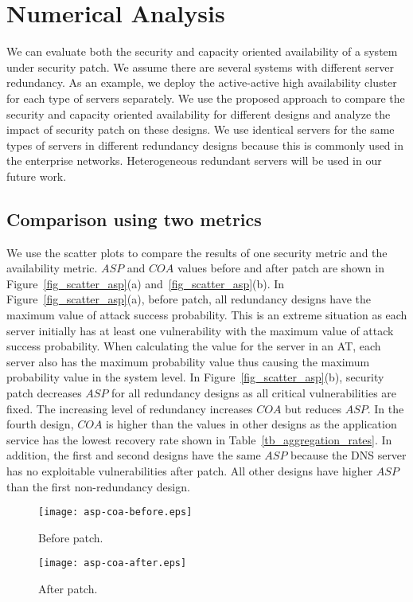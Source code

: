 \documentclass[conference]{IEEEtran}
\begin{document}
\section{Numerical Analysis}
\label{analysis}

We can evaluate both the security and capacity oriented availability of a system under security patch. We assume there are several systems with different server redundancy. As an example, we deploy the active-active high availability cluster for each type of servers separately. We use the proposed approach to compare the security and capacity oriented availability for different designs and analyze the impact of security patch on these designs. We use identical servers for the same types of servers in different redundancy designs because this is commonly used in the enterprise networks. Heterogeneous redundant servers will be used in our future work.

\subsection{Comparison using two metrics}
\label{comparison}
We use the scatter plots to compare the results of one security metric and the availability metric. $\mathit{ASP}$ and $\mathit{COA}$ values before and after patch are shown in Figure~\ref{fig_scatter_asp}(a) and~\ref{fig_scatter_asp}(b). In Figure~\ref{fig_scatter_asp}(a), before patch, all redundancy designs have the maximum value of attack success probability. This is an extreme situation as each server initially has at least one vulnerability with the maximum value of attack success probability. When calculating the value for the server in an AT, each server also has the maximum probability value thus causing the maximum probability value in the system level. In Figure~\ref{fig_scatter_asp}(b), security patch decreases $\mathit{ASP}$ for all redundancy designs as all critical vulnerabilities are fixed. The increasing level of redundancy increases $\mathit{COA}$ but reduces $\mathit{ASP}$. In the fourth design, $\mathit{COA}$ is higher than the values in other designs as the application service has the lowest recovery rate shown in Table~\ref{tb_aggregation_rates}. In addition, the first and second designs have the same $\mathit{ASP}$ because the DNS server has no exploitable vulnerabilities after patch. All other designs have higher $\mathit{ASP}$ than the first non-redundancy design.
\begin{figure*}[hbt]
    \centering
    \begin{subfigure}{0.31\textwidth}
            \texttt{[image: asp-coa-before.eps]}
            \caption{Before patch.}
    \end{subfigure}
    \begin{subfigure}{0.31\textwidth}
            \texttt{[image: asp-coa-after.eps]}
            \caption{After patch.}
    \end{subfigure}
    \caption{Comparison of multiple redundancy designs using $ASP$ and $COA$.}
    \label{fig_scatter_asp}
\end{figure*}
\end{document}
